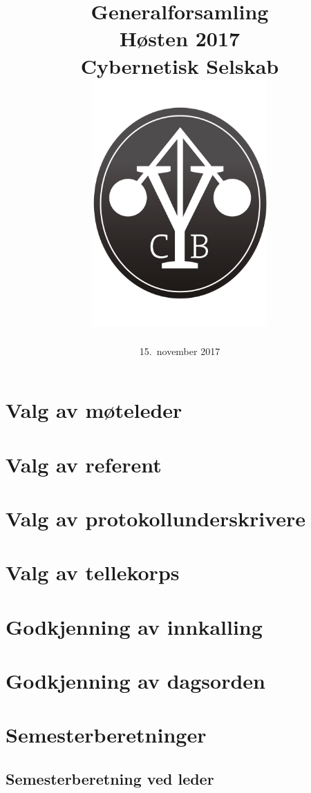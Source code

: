 \documentclass[10pt,norsk,a4paper]{article}
\title{Generalforsamling \\
	Høsten 2017\\
	Cybernetisk Selskab\\[2cm]
	\includegraphics[width=0.5\textwidth]{cyblogoa3.pdf}\\[-.5cm]}
\date{15.\ november 2017}
\begin{document}
\maketitle{}
\newpage
\tableofcontents{}


\section{Valg av møteleder}

\section{Valg av referent}

\section{Valg av protokollunderskrivere}

\section{Valg av tellekorps}

\section{Godkjenning av innkalling}

\section{Godkjenning av dagsorden}

\section{Semesterberetninger}
\subsection{Semesterberetning ved leder}
\end{document}
